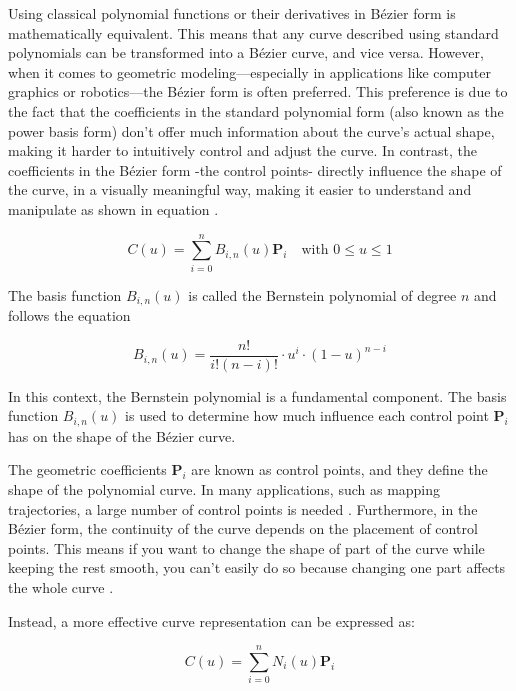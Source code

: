 Using classical polynomial functions or their derivatives in Bézier form is mathematically equivalent. 
This means that any curve described using standard polynomials can be transformed into a Bézier curve, 
and vice versa. However, when it comes to geometric modeling—especially in applications like computer 
graphics or robotics—the Bézier form is often preferred. This preference is due to the fact that the 
coefficients in the standard polynomial form (also known as the power basis form) don't offer much 
information about the curve's actual shape, making it harder to intuitively control and adjust the 
curve. In contrast, the coefficients in the Bézier form -the control points- directly influence the 
shape of the curve, in a visually meaningful way, making it easier to understand and manipulate 
as shown in equation  \cite{R28}. 

\begin{equation}
    C(u) = \sum_{i=0}^{n} B_{i,n}(u) \mathbf{P}_i \quad \text{with } 0 \leq u \leq 1 \label{Bezier curve}
\end{equation}

The basis function \( B_{i,n}(u) \) is called the Bernstein polynomial of degree \( n \) and follows the equation

\begin{equation}
    B_{i,n}(u) = \frac{n!}{i!(n - i)!} \cdot u^i \cdot (1 - u)^{n - i} \label{}
\end{equation}

In this context, the Bernstein polynomial is a fundamental component. 
The basis function \( B_{i,n}(u) \) is used to determine how much influence each control 
point \( \mathbf{P}_i \) has on the shape of the Bézier curve.

The geometric coefficients \( \mathbf{P}_i \) are known as control points, and they define 
the shape of the polynomial curve. In many applications, such as mapping trajectories, 
a large number of control points is needed \cite{R28}.
Furthermore, in the Bézier form, the continuity of the curve depends on the placement of 
control points. This means if you want to change the shape of part of the curve while keeping 
the rest smooth, you can't easily do so because changing one part affects the whole curve \cite{R29}.

Instead, a more effective curve representation can be expressed as:

\begin{equation}
    C(u) = \sum_{i=0}^{n} N_i(u) \mathbf{P}_i
\end{equation}

